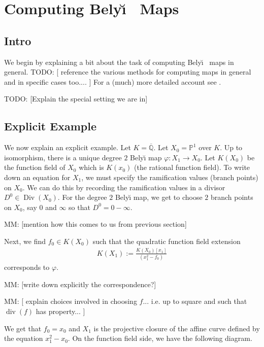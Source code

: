 \documentclass[oneside, reqno, 12pt]{amsart}
\theoremstyle{definition}
\theoremstyle{remark}
\newcommand{\Q}{\mathbb Q}
\newcommand{\PP}{\mathbb P}
\DeclareMathOperator{\Div}{Div}
\DeclareMathOperator{\ddiv}{div}
\newcommand{\mm}[1]{{\color{blue} \sf MM: [#1]}}
\newcommand{\todo}[1]{{\color{red} \sf TODO: [#1]}}
\newcommand{\Belyi}{Bely\u{\i} }
\begin{document}
\section{Computing \Belyi\ Maps}{
  \subsection{Intro}{
    We begin by explaining a bit about the task
    of computing \Belyi\ maps in general.
    \todo{
      reference the various methods for computing maps in general
      and in specific cases too....
    }
    For a (much) more detailed account see \cite{SV}.
    \par
    \todo{Explain the special setting we are in}
  }
  \subsection{Explicit Example}{
    We now explain an explicit example.
    Let $K = \overline{\Q}$.
    Let $X_0 = \PP^1$ over $K$.
    Up to isomorphism,
    there is a unique degree $2$
    \Belyi map $\varphi:X_1\to X_0$.
    Let $K(X_0)$ be the function field of $X_0$
    which is $K(x_0)$ (the rational function field).
    To write down an equation for $X_1$,
    we must specify the ramification values
    (branch points)
    on $X_0$.
    We can do this by recording
    the ramification values in a divisor
    $D^0\in\Div(X_0)$.
    For the degree $2$ \Belyi map,
    we get to choose $2$ branch points on $X_0$,
    say $0$ and $\infty$
    so that $D^0 = 0 - \infty$.
    \par
    \mm{mention how this comes to us from previous section}
    \par
    Next,
    we find $f_0\in K(X_0)$
    such that the quadratic function field extension
    \begin{align*}
      K(X_1) := \frac{K(X_0)[x_1]}{(x_1^2-f_0)}
    \end{align*}
    corresponds to $\varphi$.
    \par
    \mm{write down explicitly the correspondence?}
    \par
    \mm{
      explain choices involved in choosing $f$...
      i.e. up to square
      and such that $\ddiv(f)$ has property...
    }
    \par
    We get that $f_0 = x_0$
    and $X_1$ is the projective closure of the
    affine curve defined by the equation
    $x_1^2-x_0$.
    On the function field side,
    we have the following diagram.
    \begin{center}

\end{center}}}
\end{document}
